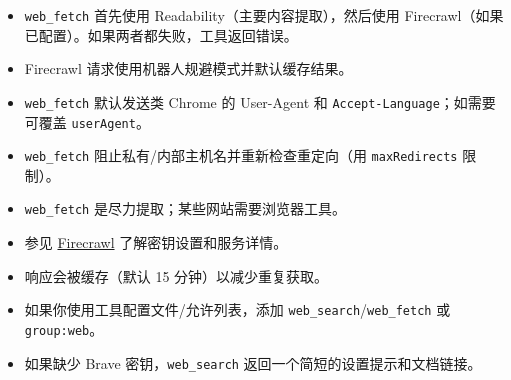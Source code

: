 \begin{itemize}
  \item \texttt{web\_fetch} 首先使用 Readability（主要内容提取），然后使用 Firecrawl（如果已配置）。如果两者都失败，工具返回错误。
  \item Firecrawl 请求使用机器人规避模式并默认缓存结果。
  \item \texttt{web\_fetch} 默认发送类 Chrome 的 User-Agent 和 \texttt{Accept-Language}；如需要可覆盖 \texttt{userAgent}。
  \item \texttt{web\_fetch} 阻止私有/内部主机名并重新检查重定向（用 \texttt{maxRedirects} 限制）。
  \item \texttt{web\_fetch} 是尽力提取；某些网站需要浏览器工具。
  \item 参见 \href{/tools/firecrawl}{Firecrawl} 了解密钥设置和服务详情。
  \item 响应会被缓存（默认 15 分钟）以减少重复获取。
  \item 如果你使用工具配置文件/允许列表，添加 \texttt{web\_search}/\texttt{web\_fetch} 或 \texttt{group:web}。
  \item 如果缺少 Brave 密钥，\texttt{web\_search} 返回一个简短的设置提示和文档链接。
\end{itemize}



\clearpage
